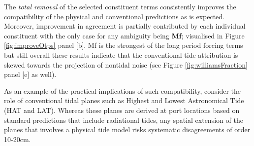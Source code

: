 The \textit{total removal} of the selected constituent terms consistently improves the compatibility of the physical and conventional predictions as is expected.   Moreover, improvement in agreement is partially contributed by each individual constituent with the only case for any ambiguity being \textbf{Mf}; visualised in Figure \ref{fig:improveOtps} panel [b]. Mf is the strongest of the long period forcing terms but still overall these results indicate that the conventional tide attribution is skewed towards the projection of nontidal noise (see Figure \ref{fig:williamsFraction} panel [e] as well). 

As an example of the practical implications of such compatibility, consider the role of conventional tidal planes such as Highest and Lowest Astronomical Tide (HAT and LAT).  Whereas these planes are derived at port locations based on standard predictions that include radiational tides, any spatial extension of the planes that involves a physical tide model risks systematic disagreements of order 10-20cm.  


